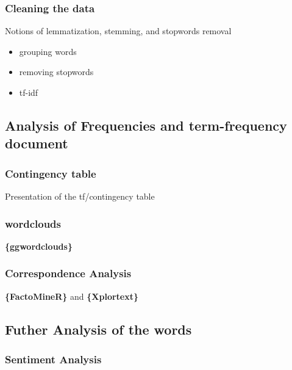 \documentclass[
]{book}
\providecommand{\tightlist}{%
  \setlength{\itemsep}{0pt}\setlength{\parskip}{0pt}}
\begin{document}
\hypertarget{cleaning-the-data}{%
\subsubsection{Cleaning the data}\label{cleaning-the-data}}

Notions of lemmatization, stemming, and stopwords removal

\begin{itemize}
\tightlist
\item
  grouping words
\item
  removing stopwords
\item
  tf-idf
\end{itemize}

\hypertarget{analysis-of-frequencies-and-term-frequency-document}{%
\subsection{Analysis of Frequencies and term-frequency document}\label{analysis-of-frequencies-and-term-frequency-document}}

\hypertarget{contingency-table}{%
\subsubsection{Contingency table}\label{contingency-table}}

Presentation of the tf/contingency table

\hypertarget{wordclouds}{%
\subsubsection{wordclouds}\label{wordclouds}}

\textbf{\{ggwordclouds\}}

\hypertarget{correspondence-analysis}{%
\subsubsection{Correspondence Analysis}\label{correspondence-analysis}}

\textbf{\{FactoMineR\}} and \textbf{\{Xplortext\}}

\hypertarget{futher-analysis-of-the-words}{%
\subsection{Futher Analysis of the words}\label{futher-analysis-of-the-words}}

\hypertarget{sentiment-analysis-1}{%
\subsubsection{Sentiment Analysis}\label{sentiment-analysis-1}}
\end{document}
